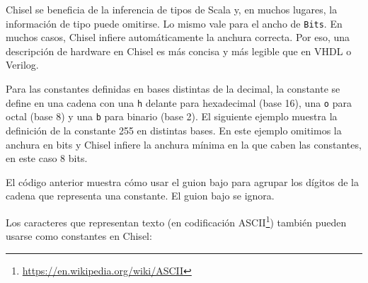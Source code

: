 \documentclass[%
    10pt,
    headinclude, footinclude=false,
    openright, %
    notitlepage,
    cleardoublepage=empty,
    headsepline,
    numbers=noenddot,
    bibliography=totoc, index=totoc,
    ]{scrbook}
\newcommand{\code}[1]{{\lstinline[basicstyle=\small\ttfamily]{#1}}}
\newcommand{\myref}[2]{\href{#1}{#2}}
\renewcommand{\myref}[2]{{#2}{\footnote{\url{#1}}}}
\begin{document}
Chisel se beneficia de la inferencia de tipos de Scala y, en muchos lugares, la información de tipo puede omitirse.
Lo mismo vale para el ancho de \code{Bits}. En muchos casos, Chisel infiere automáticamente la anchura correcta.
Por eso, una descripción de hardware en Chisel es más concisa y más legible que en VHDL o
Verilog.


Para las constantes definidas en bases distintas de la decimal, la constante se define en una cadena con
una \code{h} delante para hexadecimal (base 16), una \code{o} para octal (base 8) y una \code{b}
para binario (base 2). El siguiente ejemplo muestra la definición de la constante 255 en distintas
bases. En este ejemplo omitimos la anchura en bits y Chisel infiere la anchura mínima en la que caben
las constantes, en este caso 8 bits.



\noindent El código anterior muestra cómo usar el guion bajo para agrupar los dígitos de la
cadena que representa una constante. El guion bajo se ignora.


\newpage

Los caracteres que representan texto (en codificación \myref{https://en.wikipedia.org/wiki/ASCII}{ASCII})
también pueden usarse como constantes en Chisel:


\end{document}
